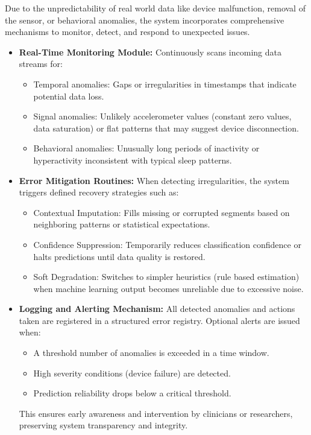 \documentclass[conference]{IEEEtran}
\begin{document}
Due to the unpredictability of real world data like device malfunction, removal of the sensor, or behavioral anomalies, the system incorporates comprehensive mechanisms to monitor, detect, and respond to unexpected issues.
\begin{itemize}
\item \textbf{Real-Time Monitoring Module:}
Continuously scans incoming data streams for:

\begin{itemize}
\item Temporal anomalies: Gaps or irregularities in timestamps that indicate potential data loss.
\item Signal anomalies: Unlikely accelerometer values (constant zero values, data saturation) or flat patterns that may suggest device disconnection.
\item Behavioral anomalies: Unusually long periods of inactivity or hyperactivity inconsistent with typical sleep patterns.
\end{itemize}

\item \textbf{Error Mitigation Routines:}
When detecting irregularities, the system triggers defined recovery strategies such as:
\begin{itemize}
    \item Contextual Imputation: Fills missing or corrupted segments based on neighboring patterns or statistical expectations.
    \item Confidence Suppression: Temporarily reduces classification confidence or halts predictions until data quality is restored.
    \item Soft Degradation: Switches to simpler heuristics (rule based estimation) when machine learning output becomes unreliable due to excessive noise.
\end{itemize}

\item \textbf{Logging and Alerting Mechanism:}
All detected anomalies and actions taken are registered in a structured error registry. Optional alerts are issued when:
\begin{itemize}
    \item A threshold number of anomalies is exceeded in a time window.
    \item High severity conditions (device failure) are detected.
    \item Prediction reliability drops below a critical threshold.
\end{itemize}
This ensures early awareness and intervention by clinicians or researchers, preserving system transparency and integrity.
\end{itemize}
\end{document}
